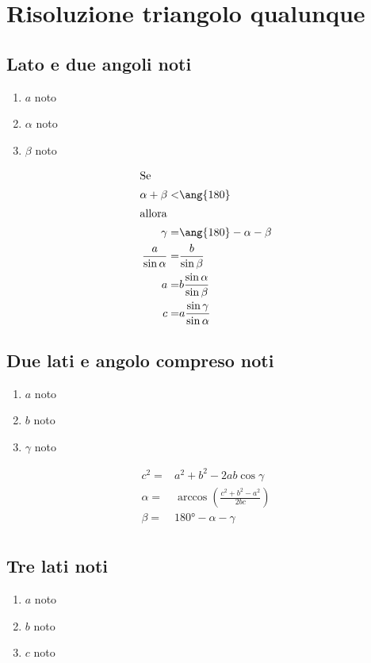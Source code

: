 \section{Risoluzione triangolo qualunque}
\begin{center}
	
\end{center}
\subsection{Lato e  due angoli noti}
\begin{enumerate}
	\item $a$ noto
	\item $\alpha$ noto
	\item $\beta$ noto
\end{enumerate}
\begin{align*}
\intertext{Se}
\alpha+\beta<&\ang{180}\\
\intertext{allora}
\gamma=&\ang{180}-\alpha-\beta\\
\frac{a}{\sin\alpha}=&\frac{b}{\sin\beta}\\
a=&b\frac{\sin\alpha}{\sin\beta}\\
c=&a\frac{\sin\gamma}{\sin\alpha}
\end{align*}
\subsection{Due lati e angolo compreso noti}
\begin{enumerate}
	\item $a$ noto
	\item $b$ noto
	\item $\gamma$ noto
\end{enumerate}
\begin{align*}
c^2=&a^2+b^2-2ab\cos\gamma\\
\alpha=&\arccos\left(\frac{c^2+b^2-a^2}{2bc} \right)\\
\beta=&\ang{180}-\alpha-\gamma\\
\end{align*}

\subsection{Tre lati noti}
\begin{enumerate}
	\item $a$ noto
	\item $b$ noto
	\item $c$ noto
\end{enumerate}